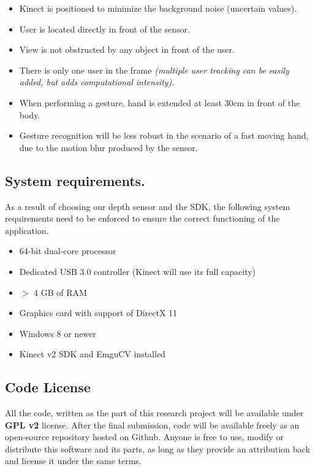 \documentclass[a4paper,11pt,oneside]{article}
\begin{document}
\begin{itemize}
\item Kinect is positioned to minimize the background noise (uncertain values).
\item User is located directly in front of the sensor.
\item View is not obstructed by any object in front of the user.
\item There is only one user in the frame \textit{(multiple user tracking can be easily added, but adds computational intensity)}.
\item When performing a gesture, hand is extended at least 30cm in front of the body.
\item Gesture recognition will be less robust in the scenario of a fast moving hand, due to the motion blur produced by the sensor.
\end{itemize}

\subsection{System requirements.}

As a result of choosing our depth sensor and the SDK, the following system requirements need to be enforced to ensure the correct functioning of the application.

\begin{itemize}
\item 64-bit dual-core processor
\item Dedicated USB 3.0 controller (Kinect will use its full capacity)
\item $>$ 4 GB of RAM
\item Graphics card with support of DirectX 11
\item Windows 8 or newer
\item Kinect v2 SDK and EmguCV installed
\end{itemize}

\subsection{Code License}

All the code, written as the part of this research project will be available under \textbf{GPL v2} license. After the final submission, code will be available freely as an open-source repository hosted on Github. Anyone is free to use, modify or distribute this software and its parts, as long as they provide an attribution back and license it under the same terms.
\end{document}

